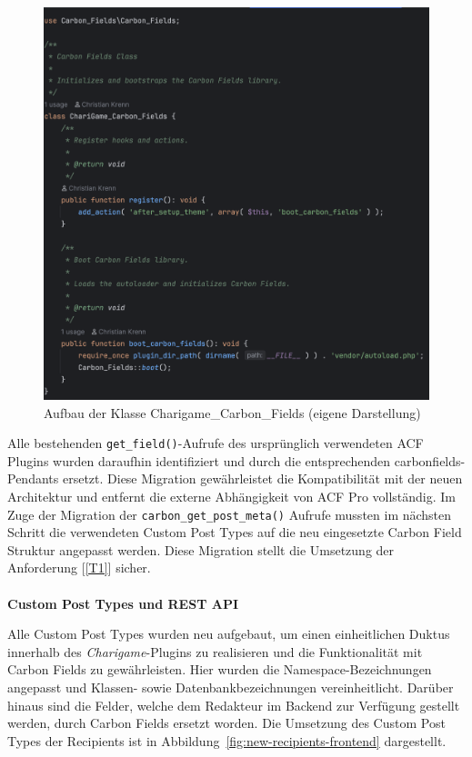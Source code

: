 \begin{figure}[H]
    \centering
    \includegraphics[width=1\textwidth]{images/carbon_fields_init}
    \caption{Aufbau der Klasse Charigame\_Carbon\_Fields (eigene Darstellung)}
    \label{fig:carbon-fields-init}
\end{figure}

Alle bestehenden \texttt{get\_field()}-Aufrufe des ursprünglich verwendeten ACF Plugins wurden daraufhin identifiziert und durch die entsprechenden \gls{carbonfields}-Pendants ersetzt.
Diese Migration gewährleistet die Kompatibilität mit der neuen Architektur und entfernt die externe Abhängigkeit von ACF Pro vollständig.
Im Zuge der Migration der \texttt{carbon\_get\_post\_meta()} Aufrufe mussten im nächsten Schritt die verwendeten Custom Post Types auf die neu eingesetzte Carbon Field Struktur angepasst werden.
Diese Migration stellt die Umsetzung der Anforderung [\ref{T1}] sicher.
\\\\
\textbf{Custom Post Types und REST API}

Alle Custom Post Types wurden neu aufgebaut, um einen einheitlichen Duktus innerhalb des \textit{Charigame}-Plugins zu realisieren und die Funktionalität mit Carbon Fields zu gewährleisten.
Hier wurden die Namespace-Bezeichnungen angepasst und Klassen- sowie Datenbankbezeichnungen vereinheitlicht.
Darüber hinaus sind die Felder, welche dem Redakteur im Backend zur Verfügung gestellt werden, durch Carbon Fields ersetzt worden.
Die Umsetzung des Custom Post Types der Recipients ist in Abbildung~\ref{fig:new-recipients-frontend} dargestellt.

